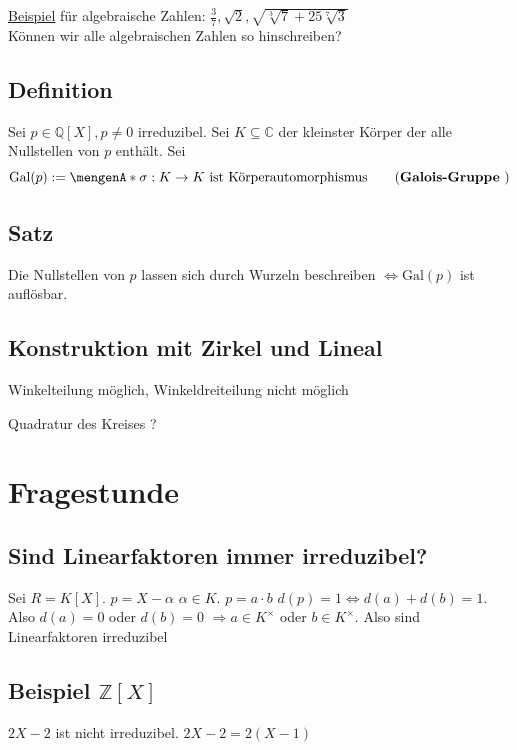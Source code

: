 \uline{Beispiel} für algebraische Zahlen: $\frac{3}{7}, \sqrt{2} , \sqrt{\sqrt[3]{7} + 25 \sqrt[7]{3}    }    $\\
Können wir alle algebraischen Zahlen so hinschreiben?

\subsection{Definition} %
\label{sub:153}
Sei $p \in \mathds{Q}[X], p \not= 0$ irreduzibel. Sei $K \subseteq \mathds{C}$ der kleinster Körper der alle Nullstellen von $p$ enthält. Sei
\[
	\mathrm{Gal} (p) := \set{\sigma : K \to K \text{ ist Körperautomorphismus}} \tag{\Index{Galois-Gruppe} }
\]

\subsection{Satz} %
\label{sub:154}
Die Nullstellen von $p$ lassen sich durch Wurzeln beschreiben $\iff \mathrm{Gal}(p)$ ist auflösbar.

\subsection{Konstruktion mit Zirkel und Lineal} %
\label{sub:155}
Winkelteilung möglich, Winkeldreiteilung nicht möglich 

Quadratur des Kreises ?




\section{Fragestunde} %
\label{sec:fragestunde}
\subsection{Sind Linearfaktoren immer irreduzibel?} %
\label{sub:sind_linearfaktoren_immer_irreduzibel_}
Sei $R=K[X]$. $p= X- \alpha$ $\alpha \in K$. $p=a \cdot b$ $d(p)=1 \iff d(a) + d(b) = 1$. Also $d(a)= 0$ oder $d(b)=0$ $\Rightarrow a \in K^\times$ oder $b \in K^\times$.
Also sind Linearfaktoren irreduzibel

\subsection{Beispiel $\mathds{Z}[X]$} %
\label{sub:beispiel_z_x_}
$2 X -2$ ist nicht irreduzibel. $2X-2= 2 (X-1)$

\cleardoubleoddemptypage
{}
\setcounter{page}{1}
\printindex
\listoffigures

